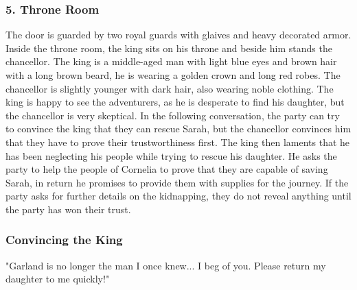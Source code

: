 \subsubsection*{5. Throne Room}
The door is guarded by two royal guards with glaives and heavy decorated armor.
Inside the throne room, the king sits on his throne and beside him stands the chancellor.
The king is a middle-aged man with light blue eyes and brown hair with a long brown beard, he is wearing a golden crown and long red robes.
The chancellor is slightly younger with dark hair, also wearing noble clothing.
The king is happy to see the adventurers, as he is desperate to find his daughter, but the chancellor is very skeptical.
In the following conversation, the party can try to convince the king that they can rescue Sarah, but the chancellor convinces him that they have to prove their trustworthiness first.
The king then laments that he has been neglecting his people while trying to rescue his daughter.
He asks the party to help the people of Cornelia to prove that they are capable of saving Sarah, in return he promises to provide them with supplies for the journey.
If the party asks for further details on the kidnapping, they do not reveal anything until the party has won their trust.

\subsubsection*{Convincing the King}
"Garland is no longer the man I once knew... I beg of you. Please return my daughter to me quickly!"

